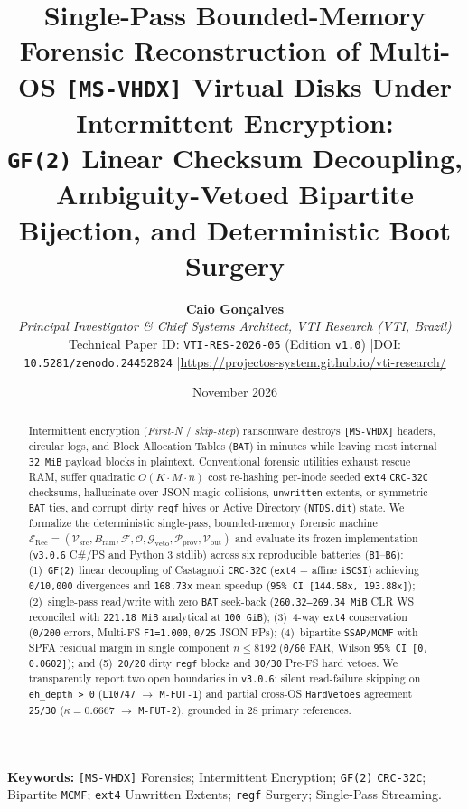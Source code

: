 \documentclass[10pt,twocolumn]{article}
\title{\Large\bfseries Single-Pass Bounded-Memory Forensic Reconstruction of Multi-OS \texttt{[MS-VHDX]} Virtual Disks Under Intermittent Encryption:\\[0.25em]
\large \texttt{GF(2)} Linear Checksum Decoupling, Ambiguity-Vetoed Bipartite Bijection, and Deterministic Boot Surgery}
\author{%
  \textbf{Caio Gon\c{c}alves}\\
  \textit{Principal Investigator \& Chief Systems Architect, VTI Research (VTI, Brazil)}\\
  \small Technical Paper ID: \texttt{VTI-RES-2026-05} (Edition \texttt{v1.0}) \quad|\quad DOI: \texttt{10.5281/zenodo.24452824} \quad|\quad \url{https://projectos-system.github.io/vti-research/}
}
\date{November 2026}
\begin{document}
\nocite{R01,R02,R03,R04,R05,R06,R07,R08,R09,R10,R11,R12,R13,R14,R15,R16,R17,R18,R19,R20,R21,R22,R23,R24,R25,R26,R27,R28}

\maketitle

\begin{abstract}
\noindent Intermittent encryption (\emph{First-N} / \emph{skip-step}) ransomware destroys \texttt{[MS-VHDX]} headers, circular logs, and Block Allocation Tables (\texttt{BAT}) in minutes while leaving most internal \texttt{32 MiB} payload blocks in plaintext. Conventional forensic utilities exhaust rescue RAM, suffer quadratic $O(K \cdot M \cdot n)$ cost re-hashing per-inode seeded \texttt{ext4} \texttt{CRC-32C} checksums, hallucinate over JSON magic collisions, \texttt{unwritten} extents, or symmetric \texttt{BAT} ties, and corrupt dirty \texttt{regf} hives or Active Directory (\texttt{NTDS.dit}) state. We formalize the deterministic single-pass, bounded-memory forensic machine $\mathcal{E}_{\mathrm{Rec}} = (\mathcal{V}_{\mathrm{src}}, B_{\mathrm{ram}}, \mathcal{F}, \mathcal{O}, \mathcal{G}_{\mathrm{veto}}, \mathcal{P}_{\mathrm{prov}}, \mathcal{V}_{\mathrm{out}})$ and evaluate its frozen implementation (\texttt{v3.0.6} C\#/PS and Python 3 stdlib) across six reproducible batteries (\texttt{B1}--\texttt{B6}): (1)~\texttt{GF(2)} linear decoupling of Castagnoli \texttt{CRC-32C} (\texttt{ext4} + affine \texttt{iSCSI}) achieving \texttt{0/10,000} divergences and \texttt{168.73x} mean speedup (\texttt{95\% CI [144.58x, 193.88x]}); (2)~single-pass read/write with zero \texttt{BAT} seek-back (\texttt{260.32--269.34 MiB} CLR WS reconciled with \texttt{221.18 MiB} analytical at \texttt{100 GiB}); (3)~4-way \texttt{ext4} conservation (\texttt{0/200} errors, Multi-FS \texttt{F1=1.000}, \texttt{0/25} JSON FPs); (4)~bipartite \texttt{SSAP/MCMF} with SPFA residual margin in single component $n \le 8192$ (\texttt{0/60} FAR, Wilson \texttt{95\% CI [0, 0.0602]}); and (5)~\texttt{20/20} dirty \texttt{regf} blocks and \texttt{30/30} Pre-FS hard vetoes. We transparently report two open boundaries in \texttt{v3.0.6}: silent read-failure skipping on \texttt{eh\_depth > 0} (\texttt{L10747} $\to$ \texttt{M-FUT-1}) and partial cross-OS \texttt{HardVetoes} agreement \texttt{25/30} ($\kappa=0.6667$ $\to$ \texttt{M-FUT-2}), grounded in 28 primary references.
\end{abstract}

\vspace{0.4em}
\noindent\textbf{Keywords:} \texttt{[MS-VHDX]} Forensics; Intermittent Encryption; \texttt{GF(2)} \texttt{CRC-32C}; Bipartite \texttt{MCMF}; \texttt{ext4} Unwritten Extents; \texttt{regf} Surgery; Single-Pass Streaming.
\end{document}
